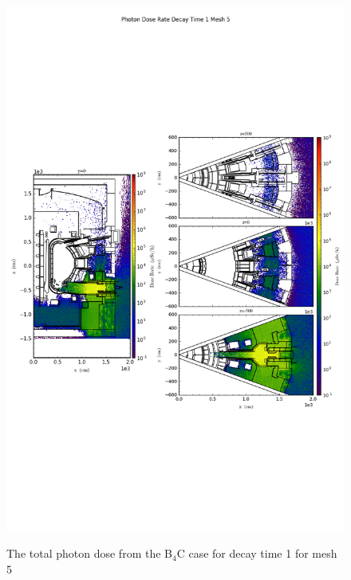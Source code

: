 \begin{figure}[ht!]
\centering
\includegraphics[trim={0cm 9cm 0cm 10cm},clip,scale=0.75]{../plots/final_model_with_b4c/Photon_Dose_Rate_Decay_Time_1_Mesh_5.png}
\label{fig:photons_dc1_no4bc_m5_flux}
\caption{The total photon dose from the B$_4$C case for decay time 1 for mesh 5}
\end{figure}
